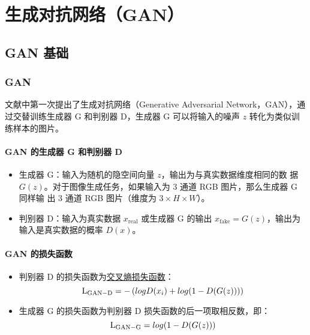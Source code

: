\part{生成对抗网络（GAN）}

\chapter{GAN 基础}
\section{GAN}

文献中第一次提出了生成对抗网络（Generative Adversarial
Network，GAN），通过交替训练生成器 G 和判别器 D，生成器 G 可以将输入的噪声 $z$
转化为类似训练样本的图片。

\subsection{GAN 的生成器 G 和判别器 D}

\begin{itemize}
  \item 生成器 G：输入为随机的隐空间向量 $z$，输出为与真实数据维度相同的数
    据 $G(z)$。对于图像生成任务，如果输入为 3 通道 RGB 图片，那么生成器 G 同样输
    出 3 通道 RGB 图片（维度为 $3 \times H \times W$）。
  \item 判别器 D：输入为真实数据 $x_{\mathrm{real}}$ 或生成器 G 的输出
    $x_{\mathrm{fake}} = G(z)$，输出为输入是真实数据的概率 $D(x)$。
\end{itemize}

\subsection{GAN 的损失函数}

\begin{itemize}
  \item 判别器 D 的损失函数为\hyperref[subsec:CELoss]{交叉熵损失函数}：
  \begin{equation}
    \label{equ:GAN-D}
    \mathrm{L}_{\mathrm{GAN-D}} = - \left( \\log D(x_i) + \\log (1-D(G(z))) \right )
  \end{equation}

  \item 生成器 G 的损失函数为判别器 D 损失函数的后一项取相反数，即：
  \begin{equation}
    \label{equ:GAN-G}
    \mathrm{L}_{\mathrm{GAN-G}} =  \\log (1-D(G(z)))
  \end{equation}
\end{itemize}

